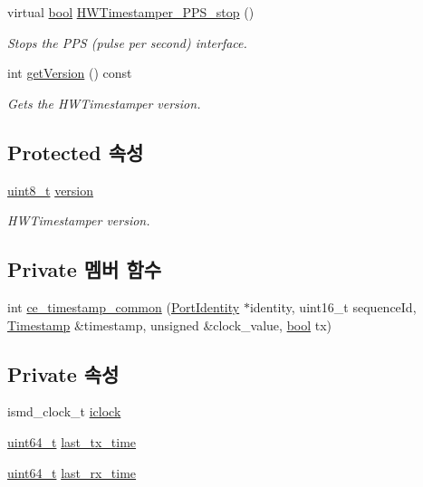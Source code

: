 \begin{DoxyCompactItemize}
virtual \hyperlink{avb__gptp_8h_af6a258d8f3ee5206d682d799316314b1}{bool} \hyperlink{class_common_timestamper_ac5d9f1e5eb402dffaa8897367e9fd7d3}{H\+W\+Timestamper\+\_\+\+P\+P\+S\+\_\+stop} ()
\begin{DoxyCompactList}\small\item\em Stops the P\+PS (pulse per second) interface. \end{DoxyCompactList}\item 
int \hyperlink{class_common_timestamper_a4d1414f8d9ed8d83c91769b148106307}{get\+Version} () const 
\begin{DoxyCompactList}\small\item\em Gets the H\+W\+Timestamper version. \end{DoxyCompactList}\end{DoxyCompactItemize}
\subsection*{Protected 속성}
\begin{DoxyCompactItemize}
\item 
\hyperlink{stdint_8h_aba7bc1797add20fe3efdf37ced1182c5}{uint8\+\_\+t} \hyperlink{class_common_timestamper_ab22abc2906422da61885ac6c8e6a1a59}{version}
\begin{DoxyCompactList}\small\item\em H\+W\+Timestamper version. \end{DoxyCompactList}\end{DoxyCompactItemize}
\subsection*{Private 멤버 함수}
\begin{DoxyCompactItemize}
\item 
int \hyperlink{class_linux_timestamper_intel_c_e_aea6548c8f8bdc0cf5c5c1a2a56e14212}{ce\+\_\+timestamp\+\_\+common} (\hyperlink{class_port_identity}{Port\+Identity} $\ast$identity, uint16\+\_\+t sequence\+Id, \hyperlink{class_timestamp}{Timestamp} \&timestamp, unsigned \&clock\+\_\+value, \hyperlink{avb__gptp_8h_af6a258d8f3ee5206d682d799316314b1}{bool} tx)
\end{DoxyCompactItemize}
\subsection*{Private 속성}
\begin{DoxyCompactItemize}
\item 
ismd\+\_\+clock\+\_\+t \hyperlink{class_linux_timestamper_intel_c_e_a5a43b6dbee61e4ed5c9bae96f5d24830}{iclock}
\item 
\hyperlink{parse_8c_aec6fcb673ff035718c238c8c9d544c47}{uint64\+\_\+t} \hyperlink{class_linux_timestamper_intel_c_e_ad099415a2577527cc1f7a0258f050d57}{last\+\_\+tx\+\_\+time}
\item 
\hyperlink{parse_8c_aec6fcb673ff035718c238c8c9d544c47}{uint64\+\_\+t} \hyperlink{class_linux_timestamper_intel_c_e_af1dded3f45070e35eba64d2474864dfb}{last\+\_\+rx\+\_\+time}
\end{DoxyCompactItemize}


